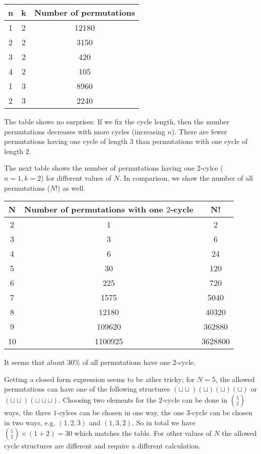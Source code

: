 \begin{tabular}{ccc}
  n  & k & Number of permutations \\ \hline
  1  & 2 & 12180 \\
  2  & 2 & 3150 \\
  3  &2 & 420 \\
  4  &2 & 105 \\ \hline
  1  &3 & 8960 \\
  2  &3 & 2240 \\
\end{tabular}

\vspace{2mm}

The table shows no surprises: If we fix the cycle length, then the number permutations decreases with more cycles (increasing $n$). There are fewer permutations having one cycle of length $3$ than permutations with one cycle of length $2$.

The next table shows the number of permutations having one $2$-cylce ($n=1, k=2$) for different values of $N$. In comparison, we show the number of all permutations ($N!$) as well. 

\vspace{2mm}

\begin{tabular}{ccc}
  N & Number of permutations with one $2$-cycle & N! \\ \hline
  2 & 1 & 2 \\
  3 & 3 & 6 \\
  4 & 6 & 24 \\
  5 & 30 & 120 \\
  6 & 225 & 720 \\
  7 & 1575 & 5040 \\
  8 & 12180 & 40320 \\
  9 & 109620 & 362880 \\
  10 & 1100925 & 3628800 
\end{tabular}

\vspace{2mm}

It seems that about $30\%$ of all permutations have one $2$-cycle.

Getting a closed form expression seems to be ather tricky; for $N=5$, the allowed permutations can have one of the following structures $(\sqcup \sqcup)(\sqcup)(\sqcup)(\sqcup)$ or $(\sqcup\sqcup)(\sqcup\sqcup\sqcup)$. Choosing two elements for the $2$-cycle can be done in ${5 \choose 2}$ ways, the three $1$-cylces can be chosen in one way, the one $3$-cycle can be chosen in two ways, e.g. $(1,2,3)$ and $(1,3,2)$. So in total we have ${5 \choose 2} \times (1 + 2) = 30$ which matches the table. For other values of $N$ the allowed cycle structures are different and require a different calculation.

